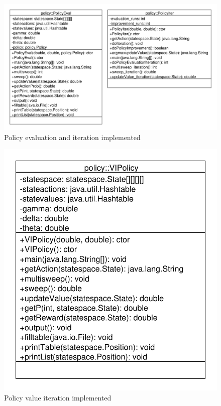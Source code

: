 \documentclass[paper=a4, fontsize=11pt]{scrartcl}
\numberwithin{equation}{section}		%
\numberwithin{figure}{section}			%
\numberwithin{table}{section}				%
\begin{document}
\begin{figure}[H] \centering
\includegraphics[scale=0.6]{uml_policies2.pdf}
\caption{Policy evaluation and iteration implemented} \label{Policies2}
\end{figure}
\begin{figure}[H] \centering
\includegraphics[scale=0.58]{uml_policies3.pdf}
\caption{Policy value iteration implemented} \label{Policies3}
\end{figure}
\end{document}
